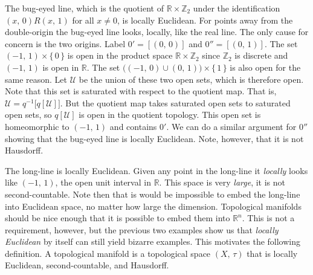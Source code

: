\documentclass{article}
\theoremstyle{plain}
\theoremstyle{normal}
\newenvironment{example}{%
    \pushQED{\qed}\renewcommand{\qedsymbol}{$\blacksquare$}\examplex%
}{%
    \popQED\endexamplex%
}
\newenvironment{definition}{%
    \pushQED{\qed}\renewcommand{\qedsymbol}{$\blacksquare$}\definitionx%
}{%
    \popQED\enddefinitionx%
}
\begin{document}
        \begin{example}
            The bug-eyed line, which is the quotient of
            $\mathbb{R}\times\mathbb{Z}_{2}$ under the identification
            $(x,\,0)R(x,\,1)$ for all $x\ne{0}$, is locally Euclidean. For
            points away from the double-origin the bug-eyed line looks, locally,
            like the real line. The only cause for concern is the two origins.
            Label $0'=[(0,\,0)]$ and $0''=[(0,\,1)]$. The set
            $(-1,\,1)\times\{\,0\,\}$ is open in the product space
            $\mathbb{R}\times\mathbb{Z}_{2}$ since $\mathbb{Z}_{2}$ is discrete
            and $(-1,\,1)$ is open in $\mathbb{R}$. The set
            $\big((-1,\,0)\cup(0,\,1)\big)\times\{\,1\,\}$ is also open for the
            same reason. Let $\mathcal{U}$ be the union of these two open sets,
            which is therefore open. Note that this set is saturated with
            respect to the quotient map. That is,
            $\mathcal{U}=q^{-1}\big[q[\mathcal{U}]\big]$. But the quotient map
            takes saturated open sets to saturated open sets, so
            $q[\mathcal{U}]$ is open in the quotient topology. This open set
            is homeomorphic to $(-1,\,1)$ and contains $0'$. We can do a
            similar argument for $0''$ showing that the bug-eyed line is
            locally Euclidean. Note, however, that it is not Hausdorff.
        \end{example}
        \begin{example}
            The long-line is locally Euclidean. Given any point in the
            long-line it \textit{locally} looks like $(-1,\,1)$, the open
            unit interval in $\mathbb{R}$. This space is very \textit{large},
            it is not second-countable. Note then that is would be impossible
            to embed the long-line into Euclidean space, no matter how large
            the dimension.
        \end{example}
        Topological manifolds should be nice enough that it is possible to
        embed them into $\mathbb{R}^{n}$. This is not a requirement, however,
        but the previous two examples show us that \textit{locally Euclidean}
        by itself can still yield bizarre examples. This motivates the
        following definition.
        \begin{definition}[\textbf{Topological Manifold}]
            A topological manifold is a topological space $(X,\,\tau)$ that
            is locally Euclidean, second-countable, and Hausdorff.
        \end{definition}
\end{document}
